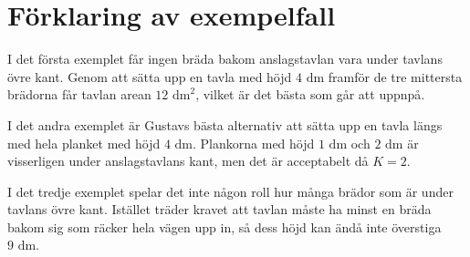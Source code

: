 \section*{Förklaring av exempelfall}
I det första exemplet får ingen bräda bakom anslagstavlan vara under tavlans övre kant.
Genom att sätta upp en tavla med höjd $4\text{ dm}$ framför de tre mittersta brädorna får tavlan arean $12\text{ dm}^2$, vilket är det bästa som går att uppnpå.

I det andra exemplet är Gustavs bästa alternativ att sätta upp en tavla längs med hela planket med höjd $4 \text{ dm}$.
Plankorna med höjd $1\text{ dm}$ och $2 \text{ dm}$ är visserligen under anslagstavlans kant, men det är acceptabelt då $K = 2$.

I det tredje exemplet spelar det inte någon roll hur många brädor som är under tavlans övre kant.
Istället träder kravet att tavlan måste ha minst en bräda bakom sig som räcker hela vägen upp in, så dess höjd kan ändå inte överstiga $9 \text{ dm}$.
